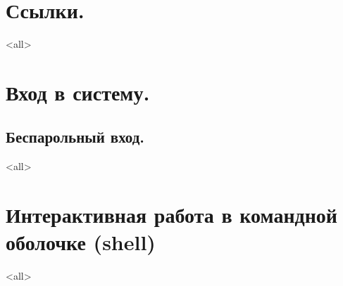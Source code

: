 \section{Ссылки.}
\mode<all>{}
\section{Вход в систему.}
\subsection{Беспарольный вход.}
\mode<all>{}
\section{Интерактивная работа в командной оболочке (shell)}
\mode<all>{}

\bye
